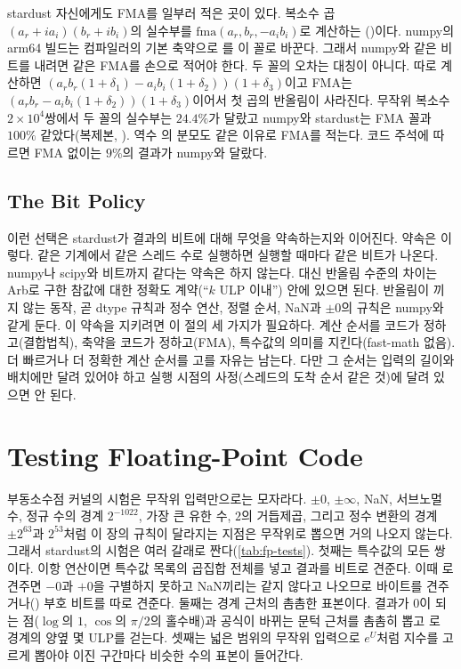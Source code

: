 stardust 자신에게도 FMA를 일부러 적은 곳이 있다. 복소수 곱 $(a_r+ia_i)(b_r+ib_i)$의 실수부를 $\mathrm{fma}(a_r,b_r,-a_ib_i)$로 계산하는 ()이다. numpy의 arm64 빌드는 컴파일러의 기본 축약으로 를 이 꼴로 바꾼다. 그래서 numpy와 같은 비트를 내려면 같은 FMA를 손으로 적어야 한다. 두 꼴의 오차는 대칭이 아니다. 따로 계산하면 $(a_rb_r(1+\delta_1)-a_ib_i(1+\delta_2))(1+\delta_3)$이고 FMA는 $(a_rb_r-a_ib_i(1+\delta_2))(1+\delta_3)$이어서 첫 곱의 반올림이 사라진다. 무작위 복소수 $2\times10^4$쌍에서 두 꼴의 실수부는 $24.4\%$가 달랐고 numpy와 stardust는 FMA 꼴과 $100\%$ 같았다(복제본, ). 역수 의 분모도 같은 이유로 FMA를 적는다. 코드 주석에 따르면 FMA 없이는 $9\%$의 결과가 numpy와 달랐다.

\subsection{The Bit Policy}

이런 선택은 stardust가 결과의 비트에 대해 무엇을 약속하는지와 이어진다. 약속은 이렇다. 같은 기계에서 같은 스레드 수로 실행하면 실행할 때마다 같은 비트가 나온다. numpy나 scipy와 비트까지 같다는 약속은 하지 않는다. 대신 반올림 수준의 차이는 Arb로 구한 참값에 대한 정확도 계약(``$k$ ULP 이내'') 안에 있으면 된다. 반올림이 끼지 않는 동작, 곧 dtype 규칙과 정수 연산, 정렬 순서, NaN과 $\pm0$의 규칙은 numpy와 같게 둔다. 이 약속을 지키려면 이 절의 세 가지가 필요하다. 계산 순서를 코드가 정하고(결합법칙), 축약을 코드가 정하고(FMA), 특수값의 의미를 지킨다(fast-math 없음). 더 빠르거나 더 정확한 계산 순서를 고를 자유는 남는다. 다만 그 순서는 입력의 길이와 배치에만 달려 있어야 하고 실행 시점의 사정(스레드의 도착 순서 같은 것)에 달려 있으면 안 된다.
\section{Testing Floating-Point Code}
\label{sec:fp-testing}

부동소수점 커널의 시험은 무작위 입력만으로는 모자라다. $\pm0$, $\pm\infty$, NaN, 서브노멀 수, 정규 수의 경계 $2^{-1022}$, 가장 큰 유한 수, $2$의 거듭제곱, 그리고 정수 변환의 경계 $\pm2^{63}$과 $2^{53}$처럼 이 장의 규칙이 달라지는 지점은 무작위로 뽑으면 거의 나오지 않는다. 그래서 stardust의 시험은 여러 갈래로 짠다(\cref{tab:fp-tests}). 첫째는 특수값의 모든 쌍이다. 이항 연산이면 특수값 목록의 곱집합 전체를 넣고 결과를 비트로 견준다. 이때 \code{==}로 견주면 $-0$과 $+0$을 구별하지 못하고 NaN끼리는 같지 않다고 나오므로 바이트를 견주거나() 부호 비트를 따로 견준다. 둘째는 경계 근처의 촘촘한 표본이다. 결과가 $0$이 되는 점($\log$의 $1$, $\cos$의 $\pi/2$의 홀수배)과 공식이 바뀌는 문턱 근처를 촘촘히 뽑고 로 경계의 양옆 몇 ULP를 걷는다. 셋째는 넓은 범위의 무작위 입력으로 $e^{U}$처럼 지수를 고르게 뽑아야 이진 구간마다 비슷한 수의 표본이 들어간다.

